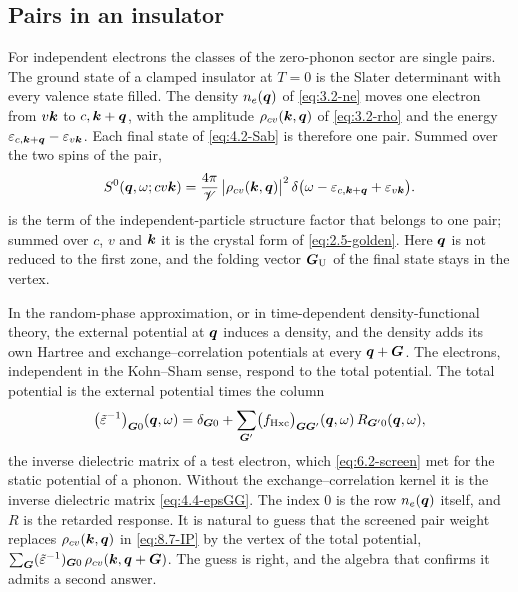 \subsection{Pairs in an insulator}\label{sec:8.7-pairs}

For independent electrons the classes of the zero-phonon sector are single pairs. The ground state of a clamped insulator at $T = 0$ is the Slater determinant with every valence state filled. The density $n_e(\bm{q})$ of \cref{eq:3.2-ne} moves one electron from $v\bm{k}$ to $c,\bm{k}+\bm{q}$, with the amplitude $\rho_{cv}(\bm{k},\bm{q})$ of \cref{eq:3.2-rho} and the energy $\varepsilon_{c,\bm{k}+\bm{q}} - \varepsilon_{v\bm{k}}$. Each final state of \cref{eq:4.2-Sab} is therefore one pair. Summed over the two spins of the pair,
\begin{equation}
  S^0(\bm{q},\omega;cv\bm{k}) = \frac{4\pi}{\mathscr{V}}\,\bigl|\rho_{cv}(\bm{k},\bm{q})\bigr|^2\,\delta\bigl(\omega - \varepsilon_{c,\bm{k}+\bm{q}} + \varepsilon_{v\bm{k}}\bigr) .
  \label{eq:8.7-IP}
\end{equation}
 is the term of the independent-particle structure factor that belongs to one pair; summed over $c$, $v$ and $\bm{k}$ it is the crystal form of \cref{eq:2.5-golden}. Here $\bm{q}$ is not reduced to the first zone, and the folding vector $\bm{G}_{\mathrm{U}}$ of the final state stays in the vertex.

In the random-phase approximation, or in time-dependent density-functional theory, the external potential at $\bm{q}$ induces a density, and the density adds its own Hartree and exchange--correlation potentials at every $\bm{q} + \bm{G}$. The electrons, independent in the Kohn--Sham sense, respond to the total potential. The total potential is the external potential times the column
\begin{equation*}
  \bigl(\tilde\varepsilon^{-1}\bigr)_{\bm{G}0}(\bm{q},\omega) = \delta_{\bm{G}0} + \sum_{\bm{G}'}\bigl(f_{\mathrm{Hxc}}\bigr)_{\bm{G}\bm{G}'}(\bm{q},\omega)\,R_{\bm{G}'0}(\bm{q},\omega) ,
\end{equation*}
the inverse dielectric matrix of a test electron, which \cref{eq:6.2-screen} met for the static potential of a phonon. Without the exchange--correlation kernel it is the inverse dielectric matrix \cref{eq:4.4-epsGG}. The index $0$ is the row $n_e(\bm{q})$ itself, and $R$ is the retarded response. It is natural to guess that the screened pair weight replaces $\rho_{cv}(\bm{k},\bm{q})$ in \cref{eq:8.7-IP} by the vertex of the total potential, $\sum_{\bm{G}}(\tilde\varepsilon^{-1})_{\bm{G}0}\,\rho_{cv}(\bm{k},\bm{q}+\bm{G})$. The guess is right, and the algebra that confirms it admits a second answer.

